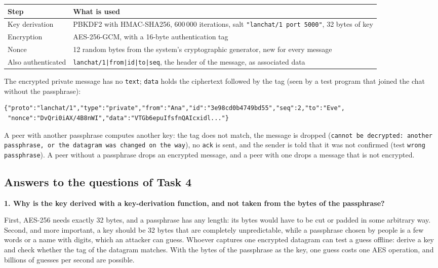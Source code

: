\documentclass[11pt,a4paper]{article}
\newcommand{\question}[1]{\par\medskip\textbf{#1}\par}
\newcommand{\code}[1]{{\frenchspacing\texttt{#1}}}
\begin{document}
\begin{center}
\small
\begin{tabularx}{\linewidth}{@{}lX@{}}
\toprule
Step & What is used \\
\midrule
Key derivation & PBKDF2 with HMAC-SHA256, 600\,000 iterations, salt \code{"lanchat/1 port 5000"},
  32 bytes of key \\
Encryption & AES-256-GCM, with a 16-byte authentication tag \\
Nonce & 12 random bytes from the system's cryptographic generator, new for every message \\
Also authenticated & \code{lanchat/1|from|id|to|seq}, the header of the message, as associated data \\
\bottomrule
\end{tabularx}
\end{center}

The encrypted private message has no \code{text}; \code{data} holds the ciphertext followed by the
tag (seen by a test program that joined the chat without the passphrase):

\begin{lstlisting}
{"proto":"lanchat/1","type":"private","from":"Ana","id":"3e98cd0b4749bd55","seq":2,"to":"Eve",
 "nonce":"DvQri0iAX/4B8nWI","data":"VTGb6epuIfsfnQAIcxidl..."}
\end{lstlisting}

A peer with another passphrase computes another key: the tag does not match, the message is dropped
(\code{cannot be decrypted: another passphrase, or the datagram was changed on the way}), no
\code{ack} is sent, and the sender is told that it was not confirmed (test
\code{wrong passphrase}). A peer without a passphrase drops an encrypted message, and a peer with
one drops a message that is not encrypted.

\subsection{Answers to the questions of Task 4}

\question{1. Why is the key derived with a key-derivation function, and not taken from the bytes of
the passphrase?}

First, AES-256 needs exactly 32 bytes, and a passphrase has any length: its bytes would have to be
cut or padded in some arbitrary way. Second, and more important, a key should be 32 bytes that are
completely unpredictable, while a passphrase chosen by people is a few words or a name with digits,
which an attacker can guess. Whoever captures one encrypted datagram can test a guess offline: derive
a key and check whether the tag of the datagram matches. With the bytes of the passphrase as the key,
one guess costs one AES operation, and billions of guesses per second are possible.
\end{document}
